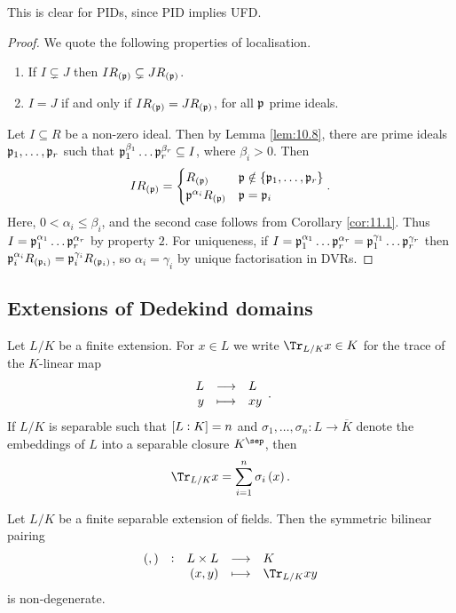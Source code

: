 \begin{remark*}
This is clear for PIDs, since PID implies UFD.
\end{remark*}

\begin{proof}
We quote the following properties of localisation.
\begin{enumerate}
\item If $ I \subsetneq J $ then $ IR_{\br{\ppp}} \subsetneq JR_{\br{\ppp}} $.
\item $ I = J $ if and only if $ IR_{\br{\ppp}} = JR_{\br{\ppp}} $, for all $ \mathfrak{p} $ prime ideals.
\end{enumerate}
Let $ I \subseteq R $ be a non-zero ideal. Then by Lemma \ref{lem:10.8}, there are prime ideals $ \mathfrak{p}_1, \dots, \mathfrak{p}_r $ such that $ \mathfrak{p}_1^{\beta_1} \dots \mathfrak{p}_r^{\beta_r} \subseteq I $, where $ \beta_i > 0 $. Then
$$ IR_{\br{\ppp}} =
\begin{cases}
R_{\br{\ppp}} & \ppp \notin \cbr{\ppp_1, \dots, \ppp_r} \\
\ppp^{\alpha_i}R_{\br{\ppp}} & \ppp = \ppp_i
\end{cases}.
$$
Here, $ 0 < \alpha_i \le \beta_i $, and the second case follows from Corollary \ref{cor:11.1}. Thus $ I = \mathfrak{p}_1^{\alpha_1} \dots \mathfrak{p}_r^{\alpha_r} $ by property $ 2 $. For uniqueness, if $ I = \mathfrak{p}_1^{\alpha_1} \dots \mathfrak{p}_r^{\alpha_r} = \mathfrak{p}_1^{\gamma_1} \dots \mathfrak{p}_r^{\gamma_r} $ then $ \ppp_i^{\alpha_i}R_{\br{\ppp_i}} = \ppp_i^{\gamma_i}R_{\br{\ppp_i}} $, so $ \alpha_i = \gamma_i $ by unique factorisation in DVRs.
\end{proof}

\subsection{Extensions of Dedekind domains}

Let $ L / K $ be a finite extension. For $ x \in L $ we write $ \Tr_{L / K} x \in K $ for the trace of the $ K $-linear map
$$ \function{L}{L}{y}{xy}. $$
If $ L / K $ is separable such that $ \sbr{L : K} = n $ and $ \sigma_1, \dots, \sigma_n : L \to \overline{K} $ denote the embeddings of $ L $ into a separable closure $ K^{\sep} $, then
$$ \Tr_{L / K} x = \sum_{i = 1}^n \sigma_i\br{x}. $$

\pagebreak

\begin{lemma}
Let $ L / K $ be a finite separable extension of fields. Then the symmetric bilinear pairing
$$ \function[\br{,}]{L \times L}{K}{\br{x, y}}{\Tr_{L / K} xy} $$
is non-degenerate.
\end{lemma}

